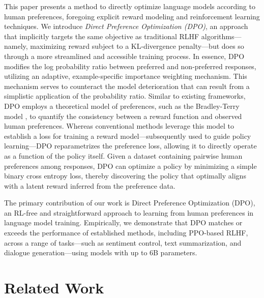 This paper presents a method to directly optimize language models according to human preferences, foregoing explicit reward modeling and reinforcement learning techniques. We introduce \textit{Direct Preference Optimization (DPO)}, an approach that implicitly targets the same objective as traditional RLHF algorithms—namely, maximizing reward subject to a KL-divergence penalty—but does so through a more streamlined and accessible training process. In essence, DPO modifies the log probability ratio between preferred and non-preferred responses, utilizing an adaptive, example-specific importance weighting mechanism. This mechanism serves to counteract the model deterioration that can result from a simplistic application of the probability ratio. Similar to existing frameworks, DPO employs a theoretical model of preferences, such as the Bradley-Terry model \cite{bradley1952rankanalysis}, to quantify the consistency between a reward function and observed human preferences. Whereas conventional methods leverage this model to establish a loss for training a reward model—subsequently used to guide policy learning—DPO reparametrizes the preference loss, allowing it to directly operate as a function of the policy itself. Given a dataset containing pairwise human preferences among responses, DPO can optimize a policy by minimizing a simple binary cross entropy loss, thereby discovering the policy that optimally aligns with a latent reward inferred from the preference data.

The primary contribution of our work is Direct Preference Optimization (DPO), an RL-free and straightforward approach to learning from human preferences in language model training. Empirically, we demonstrate that DPO matches or exceeds the performance of established methods, including PPO-based RLHF, across a range of tasks—such as sentiment control, text summarization, and dialogue generation—using models with up to 6B parameters.

\section{Related Work}

